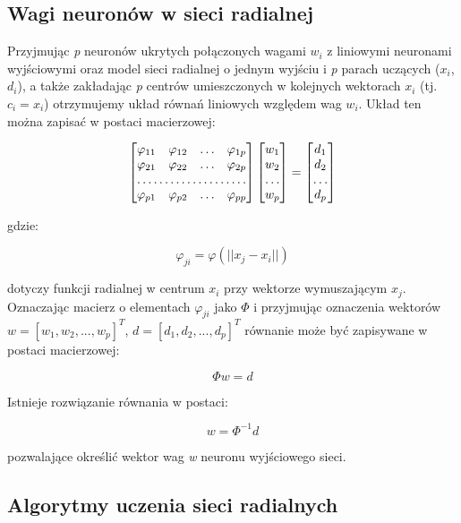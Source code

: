 \documentclass[12pt]{article}
\begin{document}
\subsection{Wagi neuronów w sieci radialnej}

Przyjmując \textsl{p} neuronów ukrytych połączonych wagami \textsl{$w_i$} z liniowymi neuronami wyjściowymi oraz model sieci radialnej o jednym wyjściu i \textsl{p} parach uczących ($x_i$, $d_i$), a także zakładając \textsl{p} centrów umieszczonych w kolejnych wektorach $x_i$ (tj. $c_i = x_i$) otrzymujemy układ równań liniowych względem wag $w_i$. Układ ten można zapisać w postaci macierzowej:

\[
\begin{bmatrix}
    \varphi_{11}  & \varphi_{12}  & \dots & \varphi_{1p} \\
    \varphi_{21}  & \varphi_{22} &  \dots & \varphi_{2p} \\
    \hdotsfor{4} \\
    \varphi_{p1}  & \varphi_{p2} &  \dots & \varphi_{pp}
\end{bmatrix}
\begin{bmatrix}
	w_1 \\
	w_2 \\
	\dots \\
	w_p
\end{bmatrix}
=
\begin{bmatrix}
	d_1 \\
	d_2 \\
	\dots \\
	d_p
\end{bmatrix}
\]

gdzie:

\[ \varphi_{ji} = \varphi(||x_j-x_i||) \]

dotyczy funkcji radialnej w centrum $x_i$ przy wektorze wymuszającym $x_j$. Oznaczając macierz o elementach $\varphi_{ji}$ jako $\Phi$ i przyjmując oznaczenia wektorów $w = [w_1, w_2, ..., w_p]^T$, $d = [d_1, d_2, ..., d_p]^T$ równanie może być zapisywane w postaci macierzowej:

\[ \Phi w = d \]

Istnieje rozwiązanie równania w postaci:

\[ w = \Phi^{-1} d \]

pozwalające określić wektor wag \textsl{w} neuronu wyjściowego sieci.

\subsection{Algorytmy uczenia sieci radialnych}
\end{document}
